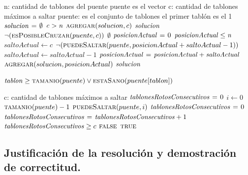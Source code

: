 \vspace*{0.5cm}


\begin{codebox}
\li \Comment n: cantidad de tablones del puente puente es el vector
\li \Comment c: cantidad de tablones máximos a saltar
\li \Comment puente: es el conjunto de tablones
\li \Comment el primer tablón es el 1
\li $\id{solucion} \gets \emptyset$
\li \If $\id{c} > \id{n}$
\li     \Then
            $\textnormal{\scshape agregar}(solucion, c)$
\li         \Return $\id{solucion}$
        \End
\li \If $\neg(\textnormal{\scshape esPosibleCruzar}(puente, c))$
\li     \Then
            \Return $\emptyset$
        \End
\li $\id{posicionActual} \gets 0$
\li \While $\id{posicionActual} \leq \id{n}$
\li     \Do
            $saltoActual \gets c$
\li         \While $\neg(\textnormal{\scshape puedeSaltar}(puente, posicionActual + saltoActual - 1))$
\li         \Do
                $saltoActual \gets saltoActual - 1$
            \End
\li     $\id{posicionActual} \gets \id{posicionActual} + \id{saltoActual}$
\li     $\textnormal{\scshape agregar}(solucion, posicionActual)$
        \End
\li \Return $\id{solucion}$
\end{codebox}


\vspace*{0.5cm}


\begin{codebox}
    \Return $\id{tablon} \geq \proc{tamanio}(puente) \lor \proc{estaSano}(puente[tablon])$
\end{codebox}


\vspace*{0.5cm}


\begin{codebox}
\li \Comment c: cantidad de tablones máximos a saltar
\li $\id{tablonesRotosConsecutivos} \gets 0$
\li \For $i \gets 0$ \To $\textnormal{\scshape tamanio}(puente) - 1$
\li     \Do
            \If $\textnormal{\scshape puedeSaltar}(puente, i)$
\li             \Then
                    $\id{tablonesRotosConsecutivos} \gets 0$
\li         \Else
\li             $\id{tablonesRotosConsecutivos} \gets \id{tablonesRotosConsecutivos} + 1$
            \End
\li         \If $\id{tablonesRotosConsecutivos} \geq c$
\li             \Then
                    \Return $\textnormal{\scshape false}$
            \End
        \End
\li \Return $\textnormal{\scshape true}$
\end{codebox}



\subsection{Justificación de la resolución y demostración de correctitud.}

